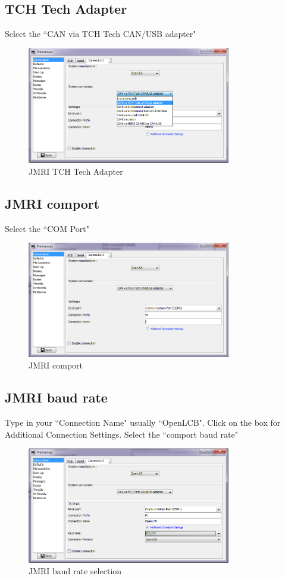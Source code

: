 \documentclass[15pt]{book}
\begin{document}
\subsection{TCH Tech Adapter}
Select the ``CAN via TCH Tech CAN/USB adapter"
\begin{figure}[htbp]
\begin{center}
\includegraphics[width=3.5in]{images/jmri_tch_adapter.png}
\caption{JMRI TCH Tech Adapter}
\end{center}
\end{figure}

\subsection{JMRI comport}
Select the ``COM Port"
\begin{figure}[htbp]
\begin{center}
\includegraphics[width=3.5in]{images/jmri_comport.png}
\caption{JMRI comport}
\end{center}
\end{figure}

\subsection{JMRI baud rate }
Type in your ``Connection Name"  usually ``OpenLCB".  Click on the box for Additional Connection Settings. Select the ``comport baud rate"
\begin{figure}[htbp]
\begin{center}
\includegraphics[width=3.5in]{images/baud_rate.png}
\caption{JMRI baud rate selection}
\end{center}
\end{figure}
\end{document}
